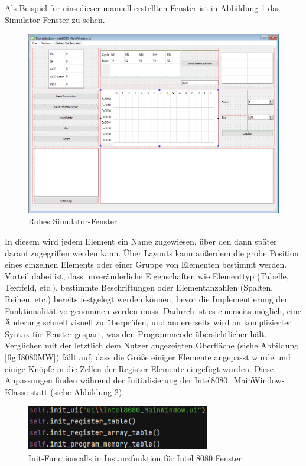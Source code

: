 \documentclass[12pt]{article}
\newcommand{\imgSpaceBefore}{\vspace{10pt}}
\begin{document}
\noindent
Als Beispiel für eins dieser manuell erstellten Fenster ist in Abbildung \ref{fig:RawUI} das Simulator-Fenster zu sehen.\imgSpaceBefore

\begin{figure}[H]
\centering
\includegraphics[width=15cm]{bilder/RawUIFile}
\caption{Rohes Simulator-Fenster}
\label{fig:RawUI}
\end{figure}

\noindent
In diesem wird jedem Element ein Name zugewiesen, über den dann später darauf zugegriffen werden kann. Über Layouts kann außerdem die grobe Position eines einzelnen Elements oder einer Gruppe von Elementen bestimmt werden. Vorteil dabei ist, dass unveränderliche Eigenschaften wie Elementtyp (Tabelle, Textfeld, etc.), bestimmte Beschriftungen oder Elementanzahlen (Spalten, Reihen, etc.) bereits festgelegt werden können, bevor die Implementierung der Funktionalität vorgenommen werden muss. Dadurch ist es einerseits möglich, eine Änderung schnell visuell zu überprüfen, und andererseits wird an komplizierter Syntax für Fenster gespart, was den Programmcode übersichtlicher hält. Verglichen mit der letztlich dem Nutzer angezeigten Oberfläche (siehe Abbildung \ref{fig:I8080MW}) fällt auf, dass die Größe einiger Elemente angepasst wurde und einige Knöpfe in die Zellen der Register-Elemente eingefügt wurden. Diese Anpassungen finden während der Initialisierung der \glqq Intel8080\_MainWindow\grqq-Klasse statt (siehe Abbildung \ref{fig:InitFuncs}).\imgSpaceBefore

\begin{figure}[H]
\centering
\includegraphics[width=8cm]{bilder/initFuncs}
\caption{Init-Functioncalls in Instanzfunktion für Intel 8080 Fenster}
\label{fig:InitFuncs}
\end{figure}
\end{document}

